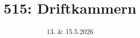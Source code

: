 
\usepackage[headsepline=true,markcase=upper]{scrlayer-scrpage}

\title{515: Driftkammern}

\date{13. \& 15.5.2026}





\maketitle

\tableofcontents















\printbibliography


